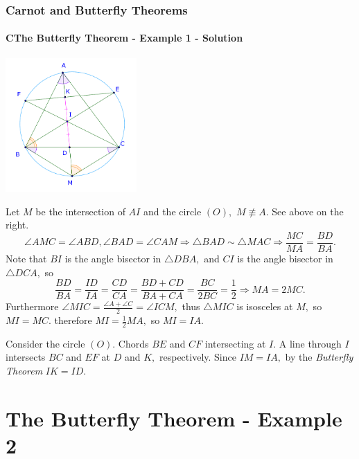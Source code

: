 \documentclass[8pt,xcolor=table,dvipsnames]{beamer}
\providecommand{\half}{\frac{1}{2}}
\begin{document}
\begin{frame}[t]
    \frametitle{Carnot and Butterfly Theorems}
    \framesubtitle{CThe Butterfly Theorem - Example 1 - Solution}
    \begin{center}
        \includegraphics[width=5cm]{./svg/pdf/24-25-s2-g3-p5-2.pdf}
    \end{center}
    \begin{overprint}
        Let $M$ be the intersection of $AI$ and the circle $(O),$ $M \not \equiv A.$ See above on the right.
        \[
            \angle AMC = \angle ABD, \angle BAD = \angle CAM \Rightarrow \triangle BAD \sim \triangle MAC \Rightarrow \frac{MC}{MA} = \frac{BD}{BA}.
        \]
        Note that $BI$ is the angle bisector in $\triangle DBA,$ and $CI$ is the angle bisector in $\triangle DCA,$ so 
        \[
            \frac{BD}{BA} = \frac{ID}{IA} = \frac{CD}{CA} = \frac{BD + CD}{BA + CA} = \frac{BC}{2BC} = \frac{1}{2}
            \Rightarrow MA = 2MC.
        \]
        Furthermore $\angle MIC = \frac{\angle A + \angle C}{2} = \angle ICM,$ thus $\triangle MIC$ is isosceles at $M,$
        so $MI = MC.$ therefore $MI = \half MA,$ so $MI = IA.$   
        
        Consider the circle $(O).$ Chords $BE$ and $CF$ intersecting at $I.$ A line through $I$ intersects $BC$ and $EF$ at $D$ and $K,$ respectively.
        Since $IM = IA,$ by the \textit{Butterfly Theorem} $\boxed{IK = ID.}$
    \end{overprint}        
\end{frame}

\section{The Butterfly Theorem - Example 2}
\end{document}
